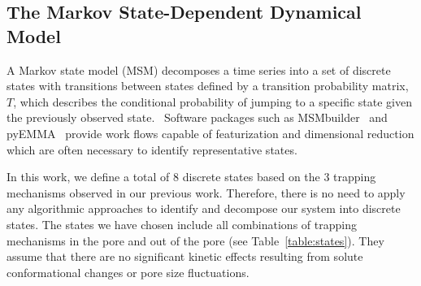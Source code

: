 \documentclass{article}
\begin{document}



  \subsection{The Markov State-Dependent Dynamical Model}\label{method:MSMs}  

  A Markov state model (MSM) decomposes a time series into a set of discrete states
  with transitions between states defined by a transition probability matrix, $T$,
  which describes the conditional probability of jumping to a specific state given
  the previously observed state.~\cite{pande_everything_2010,wehmeyer_introduction_2018}
  Software packages such as MSMbuilder~\cite{beauchamp_msmbuilder2:_2011} and 
  pyEMMA~\cite{scherer_pyemma_2015} provide work flows capable of featurization and
  dimensional reduction which are often necessary to identify representative states.

  In this work, we define a total of 8 discrete states based on the 3 trapping
  mechanisms observed in our previous work. Therefore, there is no need to 
  apply any algorithmic approaches to identify and decompose our system into 
  discrete states. The states we have chosen include all combinations of trapping
  mechanisms in the pore and out of the pore (see Table~\ref{table:states}). They
  assume that there are no significant kinetic effects resulting from solute 
  conformational changes or pore size fluctuations. 
\end{document}
